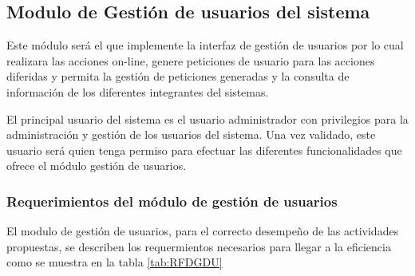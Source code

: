 \newpage

\subsection{Modulo de Gestión de usuarios del sistema}
Este módulo será el que implemente la interfaz de gestión de
usuarios por lo cual  realizara las acciones on-line, genere peticiones de usuario para las acciones
diferidas y permita la gestión de peticiones generadas y la consulta de información de los diferentes integrantes del sistemas.

El principal usuario del sistema es el usuario administrador con privilegios para la
administración y gestión de los usuarios del sistema. Una vez validado, este
usuario será quien tenga permiso para efectuar las diferentes funcionalidades que ofrece
el módulo gestión de usuarios. 
\subsubsection{Requerimientos del módulo de gestión de usuarios}
El modulo de gestión de usuarios, para el correcto desempeño de las actividades propuestas, se describen los requermientos necesarios para llegar a la eficiencia como se muestra en la tabla \ref{tab:RFDGDU}


\begin{table}[H]
	\centering
	\caption{Requerimientos de modulo de gestión de usuarios }
	\label{tab:RFDGDU}%
\end{table}%

